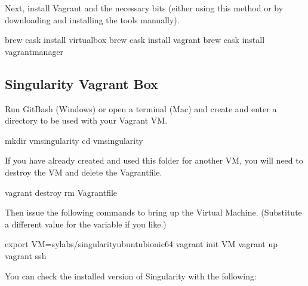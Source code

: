 \documentclass[letterpaper,10pt,english]{sphinxmanual}
\begin{document}
Next, install Vagrant and the necessary bits (either using this method or by
downloading and installing the tools manually).

%
\begin{sphinxVerbatim}[commandchars=\\\{\}]
\PYGZdl{} brew cask install virtualbox \PYGZam{}\PYGZam{} \PYGZbs{}
    brew cask install vagrant \PYGZam{}\PYGZam{} \PYGZbs{}
    brew cask install vagrant\PYGZhy{}manager
\end{sphinxVerbatim}




\subsection{Singularity Vagrant Box}
\label{\detokenize{installation:singularity-vagrant-box}}
Run GitBash (Windows) or open a terminal (Mac) and create and enter a directory
to be used with your Vagrant VM.

%
\begin{sphinxVerbatim}[commandchars=\\\{\}]
\PYGZdl{} mkdir vm\PYGZhy{}singularity \PYGZam{}\PYGZam{} \PYGZbs{}
    cd vm\PYGZhy{}singularity
\end{sphinxVerbatim}

If you have already created and used this folder for another VM, you will need
to destroy the VM and delete the Vagrantfile.

%
\begin{sphinxVerbatim}[commandchars=\\\{\}]
\PYGZdl{} vagrant destroy \PYGZam{}\PYGZam{} \PYGZbs{}
    rm Vagrantfile
\end{sphinxVerbatim}

Then issue the following commands to bring up the Virtual Machine. (Substitute a
different value for the  variable if you like.)

%
\begin{sphinxVerbatim}[commandchars=\\\{\}]
\PYGZdl{} export VM=sylabs/singularity\PYGZhy{}ubuntu\PYGZhy{}bionic64 \PYGZam{}\PYGZam{} \PYGZbs{}
    vagrant init \PYGZdl{}VM \PYGZam{}\PYGZam{} \PYGZbs{}
    vagrant up \PYGZam{}\PYGZam{} \PYGZbs{}
    vagrant ssh
\end{sphinxVerbatim}

You can check the installed version of Singularity with the following:
\end{document}
